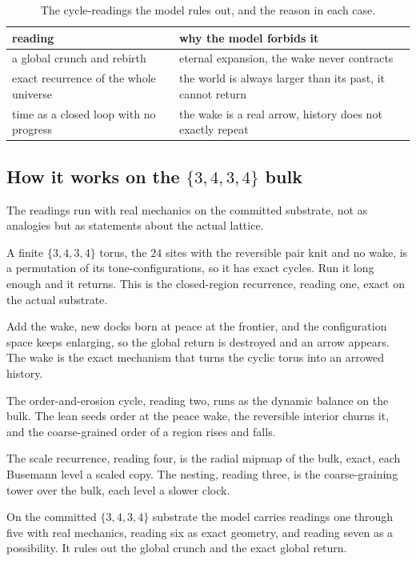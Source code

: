 \begin{table}[ht]
\centering
\begin{tabular}{@{}ll@{}}
\toprule
reading & why the model forbids it \\
\midrule
a global crunch and rebirth & eternal expansion, the wake never contracts \\
exact recurrence of the whole universe & the world is always larger than its past, it cannot return \\
time as a closed loop with no progress & the wake is a real arrow, history does not exactly repeat \\
\bottomrule
\end{tabular}
\caption{The cycle-readings the model rules out, and the reason in each case.}
\label{tab:ruled-out}
\end{table}

\subsection{How it works on the $\{3,4,3,4\}$ bulk}

The readings run with real mechanics on the committed substrate, not as analogies but as statements about the actual lattice.

A finite $\{3,4,3,4\}$ torus, the $24$ sites with the reversible pair knit and no wake, is a permutation of its tone-configurations, so it has exact cycles. Run it long enough and it returns. This is the closed-region recurrence, reading one, exact on the actual substrate.

Add the wake, new docks born at peace at the frontier, and the configuration space keeps enlarging, so the global return is destroyed and an arrow appears. The wake is the exact mechanism that turns the cyclic torus into an arrowed history.

The order-and-erosion cycle, reading two, runs as the dynamic balance on the bulk. The lean seeds order at the peace wake, the reversible interior churns it, and the coarse-grained order of a region rises and falls.

The scale recurrence, reading four, is the radial mipmap of the bulk, exact, each Busemann level a scaled copy. The nesting, reading three, is the coarse-graining tower over the bulk, each level a slower clock.

\begin{proposition}
On the committed $\{3,4,3,4\}$ substrate the model carries readings one through five with real mechanics, reading six as exact geometry, and reading seven as a possibility. It rules out the global crunch and the exact global return.
\end{proposition}

